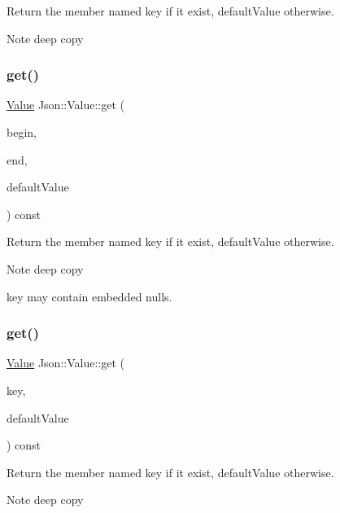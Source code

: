 Return the member named key if it exist, default\+Value otherwise. \begin{DoxyNote}{Note}
deep copy 
\end{DoxyNote}
\mbox{\label{classJson_1_1Value_aa59ed050e87e1d58d93671a38687f36c}} 
\subsubsection{\texorpdfstring{get()}{get()}\hspace{0.1cm}{\footnotesize\ttfamily [3/4]}}
{\footnotesize\ttfamily \hyperlink{classJson_1_1Value}{Value} Json\+::\+Value\+::get (\begin{DoxyParamCaption}\item[{const char $\ast$}]{begin,  }\item[{const char $\ast$}]{end,  }\item[{const \hyperlink{classJson_1_1Value}{Value} \&}]{default\+Value }\end{DoxyParamCaption}) const}

Return the member named key if it exist, default\+Value otherwise. \begin{DoxyNote}{Note}
deep copy 

key may contain embedded nulls. 
\end{DoxyNote}
\mbox{\label{classJson_1_1Value_a7406e6af727c288bf8ab59945ece686a}} 
\subsubsection{\texorpdfstring{get()}{get()}\hspace{0.1cm}{\footnotesize\ttfamily [4/4]}}
{\footnotesize\ttfamily \hyperlink{classJson_1_1Value}{Value} Json\+::\+Value\+::get (\begin{DoxyParamCaption}\item[{const J\+S\+O\+N\+C\+P\+P\+\_\+\+S\+T\+R\+I\+NG \&}]{key,  }\item[{const \hyperlink{classJson_1_1Value}{Value} \&}]{default\+Value }\end{DoxyParamCaption}) const}

Return the member named key if it exist, default\+Value otherwise. \begin{DoxyNote}{Note}
deep copy 
\end{DoxyNote}

